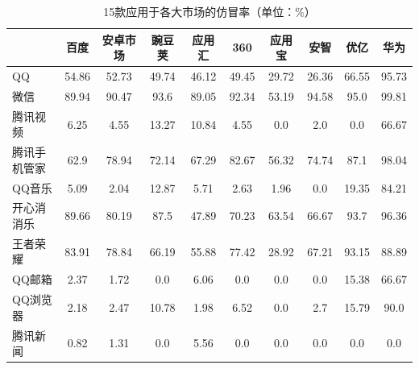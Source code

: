 \begin{table}[htbp]
    \renewcommand{\arraystretch}{1}
    \footnotesize
    \centering
    \caption{15款应用于各大市场的仿冒率（单位：\%）}
    \vspace{1mm}
    \begin{tabular}{l c c c c c c c c c}
        \toprule
                                        & {\bf 百度} & {\bf 安卓市场} & {\bf 豌豆荚} & {\bf 应用汇} & {\bf 360} & {\bf 应用宝} & {\bf 安智} & {\bf 优亿} & {\bf 华为} \\
        \midrule
        QQ                              & 54.86      & 52.73          & 49.74        & 46.12        & 49.45     & 29.72        & 26.36      & 66.55      & 95.73      \\
        \rowcolor{gray!15} 微信         & 89.94      & 90.47          & 93.6         & 89.05        & 92.34     & 53.19        & 94.58      & 95.0       & 99.81      \\
        腾讯视频                        & 6.25       & 4.55           & 13.27        & 10.84        & 4.55      & 0.0          & 2.0        & 0.0        & 66.67      \\
        \rowcolor{gray!15} 腾讯手机管家 & 62.9       & 78.94          & 72.14        & 67.29        & 82.67     & 56.32        & 74.74      & 87.1       & 98.04      \\
        QQ音乐                          & 5.09       & 2.04           & 12.87        & 5.71         & 2.63      & 1.96         & 0.0        & 19.35      & 84.21      \\
        \rowcolor{gray!15} 开心消消乐   & 89.66      & 80.19          & 87.5         & 47.89        & 70.23     & 63.54        & 66.67      & 93.7       & 96.36      \\
        王者荣耀                        & 83.91      & 78.84          & 66.19        & 55.88        & 77.42     & 28.92        & 67.21      & 93.15      & 88.89      \\
        \rowcolor{gray!15} QQ邮箱       & 2.37       & 1.72           & 0.0          & 6.06         & 0.0       & 0.0          & 0.0        & 15.38      & 66.67      \\
        QQ浏览器                        & 2.18       & 2.47           & 10.78        & 1.98         & 6.52      & 0.0          & 2.7        & 15.79      & 90.0       \\
        \rowcolor{gray!15} 腾讯新闻     & 0.82       & 1.31           & 0.0          & 5.56         & 0.0       & 0.0          & 0.0        & 0.0        & 0.0        \\

\end{tabular}
\end{table}

